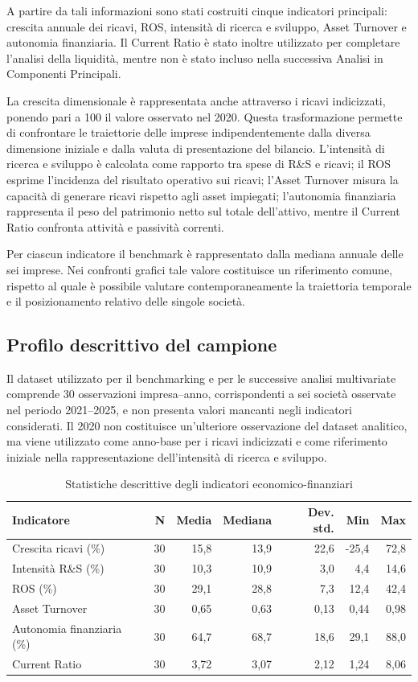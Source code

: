 \documentclass[11pt,a4paper]{article}
\begin{document}
A partire da tali informazioni sono stati costruiti cinque indicatori principali: crescita annuale dei ricavi, ROS, intensità di ricerca e sviluppo, Asset Turnover e autonomia finanziaria. Il Current Ratio è stato inoltre utilizzato per completare l'analisi della liquidità, mentre non è stato incluso nella successiva Analisi in Componenti Principali.

La crescita dimensionale è rappresentata anche attraverso i ricavi indicizzati, ponendo pari a 100 il valore osservato nel 2020. Questa trasformazione permette di confrontare le traiettorie delle imprese indipendentemente dalla diversa dimensione iniziale e dalla valuta di presentazione del bilancio. L'intensità di ricerca e sviluppo è calcolata come rapporto tra spese di R\&S e ricavi; il ROS esprime l'incidenza del risultato operativo sui ricavi; l'Asset Turnover misura la capacità di generare ricavi rispetto agli asset impiegati; l'autonomia finanziaria rappresenta il peso del patrimonio netto sul totale dell'attivo, mentre il Current Ratio confronta attività e passività correnti.

Per ciascun indicatore il benchmark è rappresentato dalla mediana annuale delle sei imprese. Nei confronti grafici tale valore costituisce un riferimento comune, rispetto al quale è possibile valutare contemporaneamente la traiettoria temporale e il posizionamento relativo delle singole società.

\subsection{Profilo descrittivo del campione}

Il dataset utilizzato per il benchmarking e per le successive analisi multivariate comprende 30 osservazioni impresa--anno, corrispondenti a sei società osservate nel periodo 2021--2025, e non presenta valori mancanti negli indicatori considerati. Il 2020 non costituisce un'ulteriore osservazione del dataset analitico, ma viene utilizzato come anno-base per i ricavi indicizzati e come riferimento iniziale nella rappresentazione dell'intensità di ricerca e sviluppo.

\begin{table}[H]
\centering
\caption{Statistiche descrittive degli indicatori economico-finanziari}
\small
\begin{tabular}{lrrrrrr}
\toprule
\textbf{Indicatore} & \textbf{N} & \textbf{Media} & \textbf{Mediana} & \textbf{Dev. std.} & \textbf{Min} & \textbf{Max} \\
\midrule
Crescita ricavi (\%) & 30 & 15,8 & 13,9 & 22,6 & -25,4 & 72,8 \\
Intensità R\&S (\%) & 30 & 10,3 & 10,9 & 3,0 & 4,4 & 14,6 \\
ROS (\%) & 30 & 29,1 & 28,8 & 7,3 & 12,4 & 42,4 \\
Asset Turnover & 30 & 0,65 & 0,63 & 0,13 & 0,44 & 0,98 \\
Autonomia finanziaria (\%) & 30 & 64,7 & 68,7 & 18,6 & 29,1 & 88,0 \\
Current Ratio & 30 & 3,72 & 3,07 & 2,12 & 1,24 & 8,06 \\
\bottomrule
\end{tabular}
\end{table}
\end{document}
